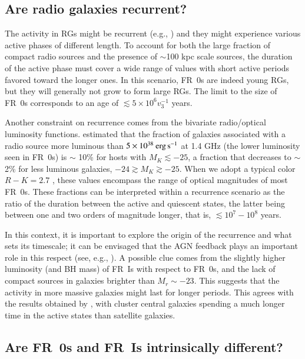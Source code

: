 \documentclass[traditabstract]{aa}
\newcommand{\ergs}{\>{\rm erg}\,{\rm s}^{-1}}
\begin{document}
\subsection{Are radio galaxies recurrent?}

The activity in RGs might be recurrent (e.g.,
\citealt{reynolds97,czerny09}) and they might experience various
active phases of different length. To account for both the large
fraction of compact radio sources and the presence of $\sim$100 kpc
scale sources, the duration of the active phase must cover a wide
range of values with short active periods favored toward the longer
ones. In this scenario, FR~0s are indeed young RGs, but they will
generally not grow to form large RGs. The limit to the size of FR~0s
corresponds to an age of $\lesssim 5\times 10^6 v_{3}^{-1}$ years.

Another constraint on recurrence comes from the bivariate radio/optical
luminosity functions. \citet{mauch07} estimated that the fraction of galaxies
associated with a radio source more luminous than $5 \times 10^{38} \ergs$ at
1.4 GHz (the lower luminosity seen in FR~0s) is $\sim$ 10\% for hosts with
$M_K \lesssim -25$, a fraction that decreases to $\sim$2\% for less luminous
galaxies, $-24 \gtrsim M_K \gtrsim -25$. When we adopt a typical color $R-K=2.7$
\citep{mannucci01}, these values encompass the range of optical magnitudes
of most FR~0s. These fractions can be interpreted within a recurrence scenario
as the ratio of the duration between the active and quiescent states, the
latter being between one and two orders of magnitude longer, that is, $\lesssim
10^{7}-10^{8}$ years.

In this context, it is important to explore the origin of the
recurrence and what sets its timescale; it can be envisaged that the
AGN feedback plays an important role in this respect (see, e.g.,
\citealt{pellegrini12}). A possible clue comes from the slightly
higher luminosity (and BH mass) of FR~Is with respect to FR~0s, and
the lack of compact sources in galaxies brighter than $M_r \sim -23$.
This suggests that the activity in more massive galaxies might last
for longer periods. This agrees with the results obtained by
\citet{shin12}, with cluster central galaxies spending a much longer
time in the active states than satellite galaxies.

\subsection{Are FR~0s and FR~Is intrinsically different?}
\end{document}
